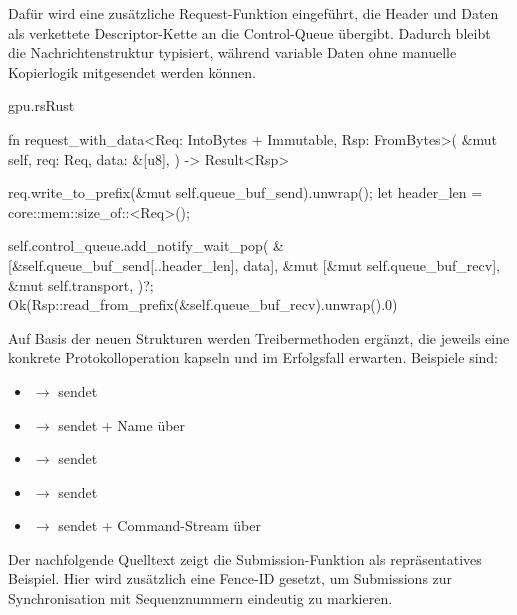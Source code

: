 Dafür wird eine zusätzliche Request-Funktion eingeführt, die Header und Daten als verkettete Descriptor-Kette an die Control-Queue übergibt. Dadurch bleibt die Nachrichtenstruktur typisiert, während variable Daten ohne manuelle Kopierlogik mitgesendet werden können.

\begin{codeblock}{gpu.rs}{Rust}
  \begin{rustcode}
fn request_with_data<Req: IntoBytes + Immutable, Rsp: FromBytes>(
    &mut self,
    req: Req,
    data: &[u8],
) -> Result<Rsp> {
    req.write_to_prefix(&mut self.queue_buf_send).unwrap();
    let header_len = core::mem::size_of::<Req>();

    self.control_queue.add_notify_wait_pop(
        &[&self.queue_buf_send[..header_len], data],
        &mut [&mut self.queue_buf_recv],
        &mut self.transport,
    )?;
    Ok(Rsp::read_from_prefix(&self.queue_buf_recv).unwrap().0)
}
  \end{rustcode}
\end{codeblock}

Auf Basis der neuen Strukturen werden Treibermethoden ergänzt, die jeweils eine konkrete Protokolloperation kapseln und im Erfolgsfall  erwarten. Beispiele sind:

\begin{itemize}
    \item {} $\rightarrow$ sendet 
    \item {} $\rightarrow$ sendet  + Name über\\ 
    \item {} $\rightarrow$ sendet 
    \item {} $\rightarrow$ sendet 
    \item {} $\rightarrow$ sendet  + Command-Stream über 
\end{itemize}

Der nachfolgende Quelltext zeigt die Submission-Funktion als repräsentatives Beispiel. Hier wird zusätzlich eine Fence-ID gesetzt, um Submissions zur Synchronisation mit Sequenznummern eindeutig zu markieren.

